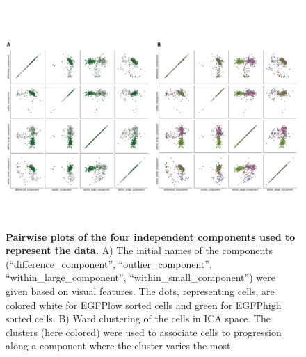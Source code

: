 \begin{figure}
    \centering
    \includegraphics[width=\textwidth]{"SF3"}
    \caption[Pairwise plots of the four independent components used to represent the data]{\textbf{Pairwise plots of the four independent components used to represent the data.} A) The initial names of the components (“difference\_component”, “outlier\_component”, “within\_large\_component”, “within\_small\_component”) were given based on visual features. The dots, representing cells, are colored white for EGFPlow sorted cells and green for EGFPhigh sorted cells. B) Ward clustering of the cells in ICA space. The clusters (here colored) were used to associate cells to progression along a component where the cluster varies the most.}
    \label{fig:ica}
\end{figure}

